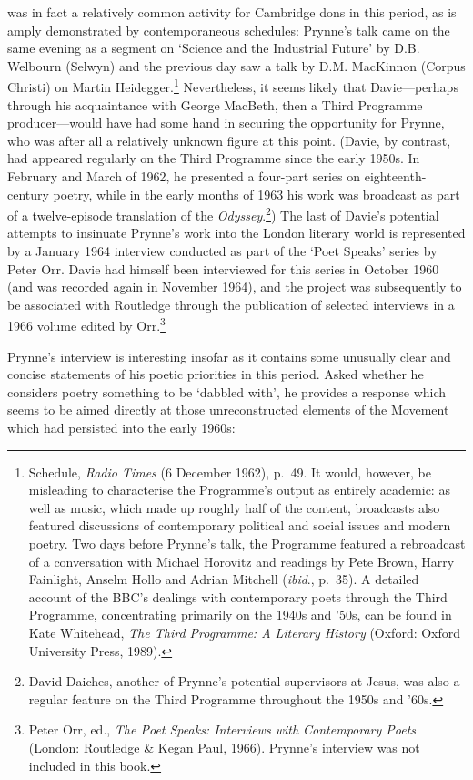 \documentclass[]{article}
\begin{document}
was in fact a relatively common activity for Cambridge dons in this
period, as is amply demonstrated by contemporaneous schedules: Prynne’s
talk came on the same evening as a segment on ‘Science and the
Industrial Future’ by D.B. Welbourn (Selwyn) and the previous day saw a
talk by D.M. MacKinnon (Corpus Christi) on Martin Heidegger.\footnote{Schedule,
  \emph{Radio Times} (6 December 1962), p.~49. It would, however, be
  misleading to characterise the Programme’s output as entirely
  academic: as well as music, which made up roughly half of the content,
  broadcasts also featured discussions of contemporary political and
  social issues and modern poetry. Two days before Prynne’s talk, the
  Programme featured a rebroadcast of a conversation with Michael
  Horovitz and readings by Pete Brown, Harry Fainlight, Anselm Hollo and
  Adrian Mitchell (\emph{ibid}., p.~35). A detailed account of the BBC’s
  dealings with contemporary poets through the Third Programme,
  concentrating primarily on the 1940s and ’50s, can be found in Kate
  Whitehead, \emph{The Third Programme: A Literary History} (Oxford:
  Oxford University Press, 1989).} Nevertheless, it seems likely that
Davie—perhaps through his acquaintance with George MacBeth, then a Third
Programme producer—would have had some hand in securing the opportunity
for Prynne, who was after all a relatively unknown figure at this point.
(Davie, by contrast, had appeared regularly on the Third Programme since
the early 1950s. In February and March of 1962, he presented a four-part
series on eighteenth-century poetry, while in the early months of 1963
his work was broadcast as part of a twelve-episode translation of the
\emph{Odyssey}.\footnote{David Daiches, another of Prynne’s potential
  supervisors at Jesus, was also a regular feature on the Third
  Programme throughout the 1950s and ’60s.}) The last of Davie’s
potential attempts to insinuate Prynne’s work into the London literary
world is represented by a January 1964 interview conducted as part of
the ‘Poet Speaks’ series by Peter Orr. Davie had himself been
interviewed for this series in October 1960 (and was recorded again in
November 1964), and the project was subsequently to be associated with
Routledge through the publication of selected interviews in a 1966
volume edited by Orr.\footnote{Peter Orr, ed., \emph{The Poet Speaks:
  Interviews with Contemporary Poets} (London: Routledge \& Kegan Paul,
  1966). Prynne’s interview was not included in this book.}

Prynne’s interview is interesting insofar as it contains some unusually
clear and concise statements of his poetic priorities in this period.
Asked whether he considers poetry something to be ‘dabbled with’, he
provides a response which seems to be aimed directly at those
unreconstructed elements of the Movement which had persisted into the
early 1960s:
\end{document}
